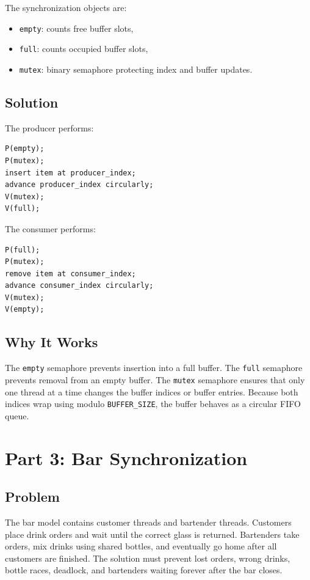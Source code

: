 \documentclass[12pt,a4paper]{article}
\begin{document}
The synchronization objects are:

\begin{itemize}
    \item \texttt{empty}: counts free buffer slots,
    \item \texttt{full}: counts occupied buffer slots,
    \item \texttt{mutex}: binary semaphore protecting index and buffer updates.
\end{itemize}

\subsection{Solution}

The producer performs:

\begin{lstlisting}[style=shellstyle]
P(empty);
P(mutex);
insert item at producer_index;
advance producer_index circularly;
V(mutex);
V(full);
\end{lstlisting}

The consumer performs:

\begin{lstlisting}[style=shellstyle]
P(full);
P(mutex);
remove item at consumer_index;
advance consumer_index circularly;
V(mutex);
V(empty);
\end{lstlisting}

\subsection{Why It Works}

The \texttt{empty} semaphore prevents insertion into a full buffer. The
\texttt{full} semaphore prevents removal from an empty buffer. The
\texttt{mutex} semaphore ensures that only one thread at a time changes the
buffer indices or buffer entries. Because both indices wrap using modulo
\texttt{BUFFER\_SIZE}, the buffer behaves as a circular FIFO queue.

\section{Part 3: Bar Synchronization}

\subsection{Problem}

The bar model contains customer threads and bartender threads. Customers place
drink orders and wait until the correct glass is returned. Bartenders take
orders, mix drinks using shared bottles, and eventually go home after all
customers are finished. The solution must prevent lost orders, wrong drinks,
bottle races, deadlock, and bartenders waiting forever after the bar closes.
\end{document}
